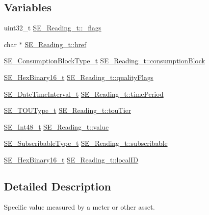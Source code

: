 \subsection*{Variables}
\begin{DoxyCompactItemize}
\item 
uint32\+\_\+t \hyperlink{group__Reading_gaa7f6de4bc1e39a68c78b5e16db226694}{S\+E\+\_\+\+Reading\+\_\+t\+::\+\_\+flags}
\item 
char $\ast$ \hyperlink{group__Reading_ga95c214b9b296909170e1426a83adcd63}{S\+E\+\_\+\+Reading\+\_\+t\+::href}
\item 
\hyperlink{group__ConsumptionBlockType_ga526f797922e4c3009d50c28f457c462e}{S\+E\+\_\+\+Consumption\+Block\+Type\+\_\+t} \hyperlink{group__Reading_ga23b7fc58868416c4249ac364750c8884}{S\+E\+\_\+\+Reading\+\_\+t\+::consumption\+Block}
\item 
\hyperlink{group__HexBinary16_gac040be0e918a360be6bcf5e8b8ad2c49}{S\+E\+\_\+\+Hex\+Binary16\+\_\+t} \hyperlink{group__Reading_ga4ba92621db8e5121414fbf926f56c57b}{S\+E\+\_\+\+Reading\+\_\+t\+::quality\+Flags}
\item 
\hyperlink{structSE__DateTimeInterval__t}{S\+E\+\_\+\+Date\+Time\+Interval\+\_\+t} \hyperlink{group__Reading_gae2c965e36cb3bfd4d5efe6772099ac2c}{S\+E\+\_\+\+Reading\+\_\+t\+::time\+Period}
\item 
\hyperlink{group__TOUType_gadcfd871f87df34ae8228b9484ebedc6a}{S\+E\+\_\+\+T\+O\+U\+Type\+\_\+t} \hyperlink{group__Reading_gaba7139999e2a8cbd77c4caf446c80503}{S\+E\+\_\+\+Reading\+\_\+t\+::tou\+Tier}
\item 
\hyperlink{group__Int48_ga87620025dc9f6c732fa48fcab95861ce}{S\+E\+\_\+\+Int48\+\_\+t} \hyperlink{group__Reading_ga298b1b3d2687afb45f8b481db80648de}{S\+E\+\_\+\+Reading\+\_\+t\+::value}
\item 
\hyperlink{group__SubscribableType_ga5c41f553d369710ed34619266bf2551e}{S\+E\+\_\+\+Subscribable\+Type\+\_\+t} \hyperlink{group__Reading_ga2b7915c8c3cbef1287a66b4b501dad3c}{S\+E\+\_\+\+Reading\+\_\+t\+::subscribable}
\item 
\hyperlink{group__HexBinary16_gac040be0e918a360be6bcf5e8b8ad2c49}{S\+E\+\_\+\+Hex\+Binary16\+\_\+t} \hyperlink{group__Reading_ga5242942e56b0d190231a18aa848f5912}{S\+E\+\_\+\+Reading\+\_\+t\+::local\+ID}
\end{DoxyCompactItemize}


\subsection{Detailed Description}
Specific value measured by a meter or other asset. 


